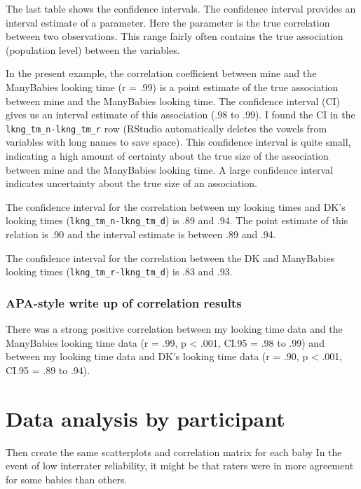 \documentclass[
]{book}
\begin{document}
The last table shows the confidence intervals. The confidence interval provides an interval estimate of a parameter. Here the parameter is the true correlation between two observations. This range fairly often contains the true association (population level) between the variables.

In the present example, the correlation coefficient between mine and the ManyBabies looking time (r = .99) is a point estimate of the true association between mine and the ManyBabies looking time. The confidence interval (CI) gives us an interval estimate of this association (.98 to .99). I found the CI in the \texttt{lkng\_tm\_n-lkng\_tm\_r} row (RStudio automatically deletes the vowels from variables with long names to save space). This confidence interval is quite small, indicating a high amount of certainty about the true size of the association between mine and the ManyBabies looking time. A large confidence interval indicates uncertainty about the true size of an association.

The confidence interval for the correlation between my looking times and DK's looking times (\texttt{lkng\_tm\_n-lkng\_tm\_d}) is .89 and .94. The point estimate of this relation is .90 and the interval estimate is between .89 and .94.

The confidence interval for the correlation between the DK and ManyBabies looking times (\texttt{lkng\_tm\_r-lkng\_tm\_d}) is .83 and .93.

\hypertarget{apa-style-write-up-of-correlation-results}{%
\subsubsection{APA-style write up of correlation results}\label{apa-style-write-up-of-correlation-results}}

There was a strong positive correlation between my looking time data and the ManyBabies looking time data (r = .99, p \textless{} .001, CI.95 = .98 to .99) and between my looking time data and DK's looking time data (r = .90, p \textless{} .001, CI.95 = .89 to .94).

\hypertarget{data-analysis-by-participant}{%
\section{Data analysis by participant}\label{data-analysis-by-participant}}

Then create the same scatterplots and correlation matrix for each baby In the event of low interrater reliability, it might be that raters were in more agreement for some babies than others.
\end{document}
